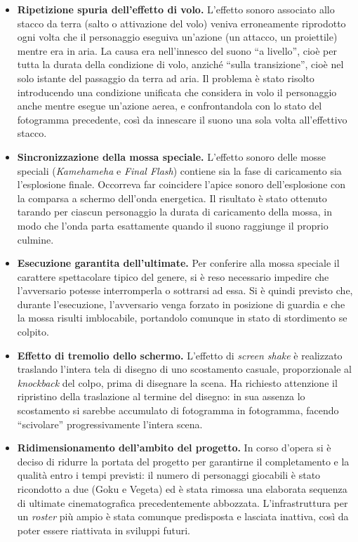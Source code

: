 \documentclass[12pt,a4paper]{report}
\begin{document}
\begin{itemize}
  \item \textbf{Ripetizione spuria dell'effetto di volo.} L'effetto sonoro associato allo stacco da terra (salto o attivazione del volo) veniva erroneamente riprodotto ogni volta che il personaggio eseguiva un'azione (un attacco, un proiettile) mentre era in aria. La causa era nell'innesco del suono ``a livello'', cioè per tutta la durata della condizione di volo, anziché ``sulla transizione'', cioè nel solo istante del passaggio da terra ad aria. Il problema è stato risolto introducendo una condizione unificata che considera in volo il personaggio anche mentre esegue un'azione aerea, e confrontandola con lo stato del fotogramma precedente, così da innescare il suono una sola volta all'effettivo stacco.

  \item \textbf{Sincronizzazione della mossa speciale.} L'effetto sonoro delle mosse speciali (\emph{Kamehameha} e \emph{Final Flash}) contiene sia la fase di caricamento sia l'esplosione finale. Occorreva far coincidere l'apice sonoro dell'esplosione con la comparsa a schermo dell'onda energetica. Il risultato è stato ottenuto tarando per ciascun personaggio la durata di caricamento della mossa, in modo che l'onda parta esattamente quando il suono raggiunge il proprio culmine.

  \item \textbf{Esecuzione garantita dell'ultimate.} Per conferire alla mossa speciale il carattere spettacolare tipico del genere, si è reso necessario impedire che l'avversario potesse interromperla o sottrarsi ad essa. Si è quindi previsto che, durante l'esecuzione, l'avversario venga forzato in posizione di guardia e che la mossa risulti imblocabile, portandolo comunque in stato di stordimento se colpito.

  \item \textbf{Effetto di tremolio dello schermo.} L'effetto di \emph{screen shake} è realizzato traslando l'intera tela di disegno di uno scostamento casuale, proporzionale al \emph{knockback} del colpo, prima di disegnare la scena. Ha richiesto attenzione il ripristino della traslazione al termine del disegno: in sua assenza lo scostamento si sarebbe accumulato di fotogramma in fotogramma, facendo ``scivolare'' progressivamente l'intera scena.

  \item \textbf{Ridimensionamento dell'ambito del progetto.} In corso d'opera si è deciso di ridurre la portata del progetto per garantirne il completamento e la qualità entro i tempi previsti: il numero di personaggi giocabili è stato ricondotto a due (Goku e Vegeta) ed è stata rimossa una elaborata sequenza di ultimate cinematografica precedentemente abbozzata. L'infrastruttura per un \emph{roster} più ampio è stata comunque predisposta e lasciata inattiva, così da poter essere riattivata in sviluppi futuri.


\end{itemize}
\end{document}
